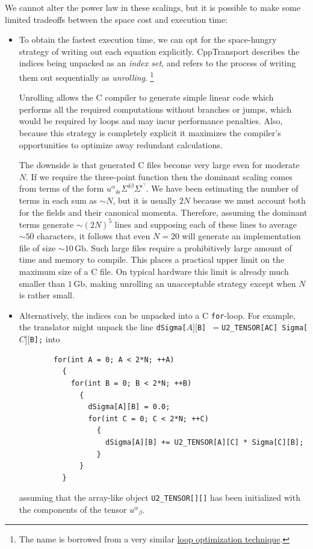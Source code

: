 \documentclass[11pt,a4paper]{article}
\newcommand{\packagefont}{\sffamily}
\newcommand{\CppTransport}{{\packagefont CppTransport}}
\newcommand{\Gb}{\,\mathrm{Gb}}
\newcommand\CC{C\nolinebreak\hspace{-.05em}\raisebox{.4ex}{\relsize{-3}{\textbf{+}}}\nolinebreak\hspace{-.10em}\raisebox{.4ex}{\relsize{-3}{\textbf{+}}}}
\begin{document}
We cannot alter the power law in these scalings,
but it is possible to
make some limited tradeoffs between the space cost and execution time:
\begin{itemize}
    \item To obtain the fastest execution time, we can opt for the
    space-hungry strategy of writing out each equation explicitly.
    {\CppTransport} describes the indices being unpacked as an
    \emph{index set}, and refers to the process of writing them
    out sequentially as \emph{unrolling}.%
    	\footnote{The name is borrowed from a very similar
    	\href{https://en.wikipedia.org/wiki/Loop_unrolling}{loop optimization technique}.}
    	    
    Unrolling allows the {\CC} compiler to generate simple linear code
    which performs all the required computations without branches
    or jumps, which would be required by loops
    and may incur performance penalties.
    Also,
    because this strategy is completely explicit it maximizes
    the compiler's opportunities to optimize away redundant calculations.
    
    The downside is that generated {\CC} files become
    very large even for moderate $N$.
    If we require the three-point function
    then the dominant scaling comes from terms of the form
    ${u^\alpha}_{\delta\epsilon} \Sigma^{\delta\beta} \Sigma^{\epsilon^\gamma}$.
    We have been estimating the number of terms in each sum as $\sim N$,
    but it is usually $2N$ because we must account both for
    the fields and their canonical momenta.
    Therefore,
    assuming the dominant terms generate $\sim (2N)^5$ lines
    and supposing each of these lines to average $\sim 50$ characters,
    it follows that even $N = 20$ will generate an implementation file of
    size $\sim 10 \Gb$.
    Such large files require a prohibitively large amount of time and memory to compile.
    This places a practical upper limit on the maximum size of a {\CC} file.
    On typical hardware this limit is already much smaller than $1 \Gb$,
    making unrolling an unacceptable strategy except when $N$ is rather small.
    
    \item Alternatively, the indices can be unpacked into a
    {\CC} \texttt{for}-loop.
    For example, the translator
    might unpack the line
    \texttt{dSigma[$A][$B] $= $U2_TENSOR[AC] Sigma[$C][$B];}
    into
    \begin{verbatim}
        for(int A = 0; A < 2*N; ++A)
          {
            for(int B = 0; B < 2*N; ++B)
              {
                dSigma[A][B] = 0.0;
                for(int C = 0; C < 2*N; ++C)
                  {
                    dSigma[A][B] += U2_TENSOR[A][C] * Sigma[C][B];
                  }
              }
          }
    \end{verbatim}
    assuming that the array-like object
    \texttt{U2_TENSOR[][]} has been initialized with the
    components of the tensor ${u^\alpha}_\beta$.


\end{itemize}
\end{document}
